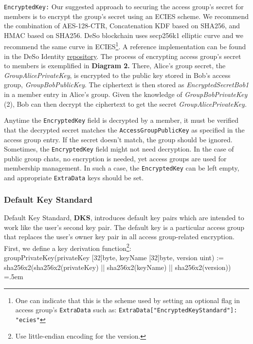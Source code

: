 \documentclass[oneside, 12pt]{article}
\newenvironment{lcverbatim}
 {\SaveVerbatim{cverb}}
 {\endSaveVerbatim
  \flushleft\fboxrule=0pt\fboxsep=.5em
  \colorbox{cverbbg}{%
    \makebox[\dimexpr\linewidth-2\fboxsep][l]{\BUseVerbatim{cverb}}%
  }
  \endflushleft
}
\newcommand{\ctexttt}[1]{\colorbox{cverbbg}{\texttt{#1}}}
\newcommand{\fn}[1]{\footnote{\hangpara{1.4em}{1} #1}}
\begin{document}
\ctexttt{EncryptedKey:} Our suggested approach to securing the access group’s secret for members is to encrypt the group’s secret using an ECIES scheme. We recommend the combination of AES-128-CTR, Concatenation KDF based on SHA256, and HMAC based on SHA256. DeSo blockchain uses secp256k1 elliptic curve and we recommend the same curve in ECIES\fn{One can indicate that this is the scheme used by setting an optional flag in access group’s \texttt{ExtraData} such as: \texttt{ExtraData["EncryptedKeyStandard"]: "ecies"}}. A reference implementation can be found in the DeSo Identity \href{https://github.com/deso-protocol/identity/blob/main/src/lib/ecies/index.js}{repository}. The process of encrypting access group’s secret to members is exemplified in \textbf{Diagram 2.} There, Alice’s group secret, the \textit{GroupAlicePrivateKey}, is encrypted to the public key stored in Bob’s access group, \textit{GroupBobPublicKey}. The ciphertext is then stored as \textit{EncryptedSecretBob1} in a member entry in Alice’s group. Given the knowledge of \textit{GroupBobPrivateKey} (2), Bob can then decrypt the ciphertext to get the secret \textit{GroupAlicePrivateKey.}

Anytime the \texttt{EncryptedKey} field is decrypted by a member, it must be verified that the decrypted secret matches the \texttt{AccessGroupPublicKey} as specified in the access group entry. If the secret doesn’t match, the group should be ignored. Sometimes, the \texttt{EncryptedKey} field might not need decryption. In the case of public group chats, no encryption is needed, yet access groups are used for membership management. In such a case, the \texttt{EncryptedKey} can be left empty, and appropriate \texttt{ExtraData} keys should be set.

\subsubsection{Default Key Standard}
Default Key Standard, \textbf{DKS}, introduces default key pairs which are intended to work like the user's second key pair. The default key is a particular access group that replaces the user’s owner key pair in all access group-related encryption. First, we define a key derivation function\fn{Use little-endian encoding for the version.}:\\

\small{
\begin{lcverbatim}
groupPrivateKey(privateKey [32]byte, keyName [32]byte, version uint) :=
   sha256x2(sha256x2(privateKey) || sha256x2(keyName) || sha256x2(version))
\end{lcverbatim}
}
\end{document}
